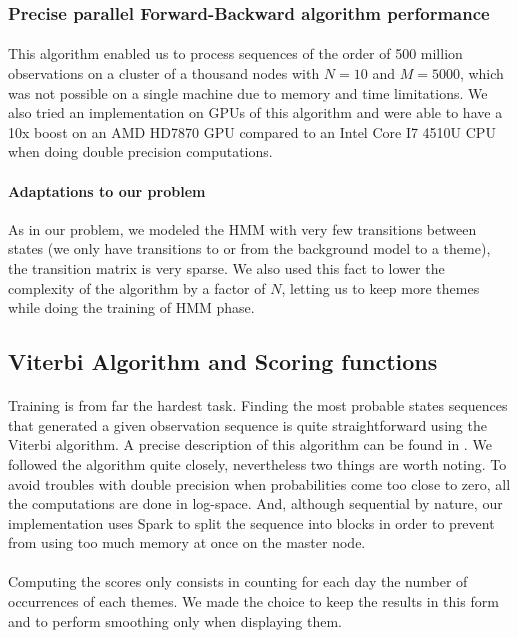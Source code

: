 \subsubsection*{Precise parallel Forward-Backward algorithm performance}
\paragraph{}
This algorithm enabled us to process sequences of the order of 500 million observations on a cluster of a thousand nodes with $N=10$ and $M=5000$, which was not possible on a single machine due to memory and time limitations. We also tried an implementation on GPUs of this algorithm and were able to have a 10x boost on an AMD HD7870 GPU compared to an Intel Core I7 4510U CPU when doing double precision computations.

\paragraph{Adaptations to our problem}
As in our problem, we modeled the HMM with very few transitions between states (we only have transitions to or from the background model to a theme), the transition matrix is very sparse. We also used this fact to lower the complexity of the algorithm by a factor of $N$, letting us to keep more themes while doing the training of HMM phase.

\subsection{Viterbi Algorithm and Scoring functions}
\paragraph{}
Training is from far the hardest task. Finding the most probable states sequences that generated a given observation sequence is quite straightforward using the Viterbi algorithm. A precise description of this algorithm can be found in \cite{rabiner1989tutorial}. We followed the algorithm quite closely, nevertheless two things are worth noting. To avoid troubles with double precision when probabilities come too close to zero, all the computations are done in log-space. And, although sequential by nature, our implementation uses Spark to split the sequence into blocks in order to prevent from using too much memory at once on the master node.

\paragraph{}
Computing the scores only consists in counting for each day the number of occurrences of each themes. We made the choice to keep the results in this form and to perform smoothing only when displaying them.

